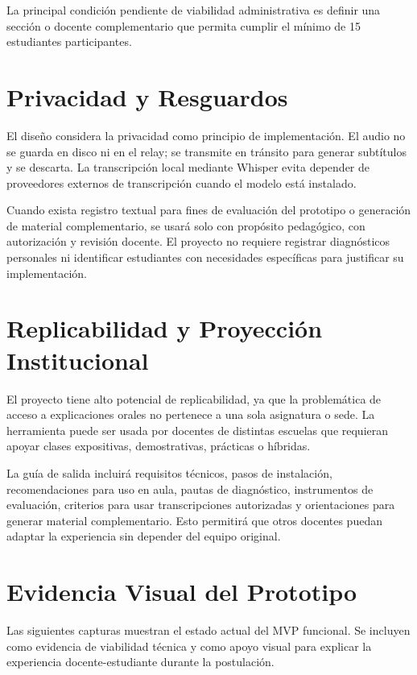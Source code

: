 \documentclass[11pt,letterpaper]{article}
\begin{document}
La principal condición pendiente de viabilidad administrativa es definir una sección o docente complementario que permita cumplir el mínimo de 15 estudiantes participantes.

\section{Privacidad y Resguardos}

El diseño considera la privacidad como principio de implementación. El audio no se guarda en disco ni en el relay; se transmite en tránsito para generar subtítulos y se descarta. La transcripción local mediante Whisper evita depender de proveedores externos de transcripción cuando el modelo está instalado.

Cuando exista registro textual para fines de evaluación del prototipo o generación de material complementario, se usará solo con propósito pedagógico, con autorización y revisión docente. El proyecto no requiere registrar diagnósticos personales ni identificar estudiantes con necesidades específicas para justificar su implementación.

\section{Replicabilidad y Proyección Institucional}

El proyecto tiene alto potencial de replicabilidad, ya que la problemática de acceso a explicaciones orales no pertenece a una sola asignatura o sede. La herramienta puede ser usada por docentes de distintas escuelas que requieran apoyar clases expositivas, demostrativas, prácticas o híbridas.

La guía de salida incluirá requisitos técnicos, pasos de instalación, recomendaciones para uso en aula, pautas de diagnóstico, instrumentos de evaluación, criterios para usar transcripciones autorizadas y orientaciones para generar material complementario. Esto permitirá que otros docentes puedan adaptar la experiencia sin depender del equipo original.

\section{Evidencia Visual del Prototipo}

Las siguientes capturas muestran el estado actual del MVP funcional. Se incluyen como evidencia de viabilidad técnica y como apoyo visual para explicar la experiencia docente-estudiante durante la postulación.
\end{document}
